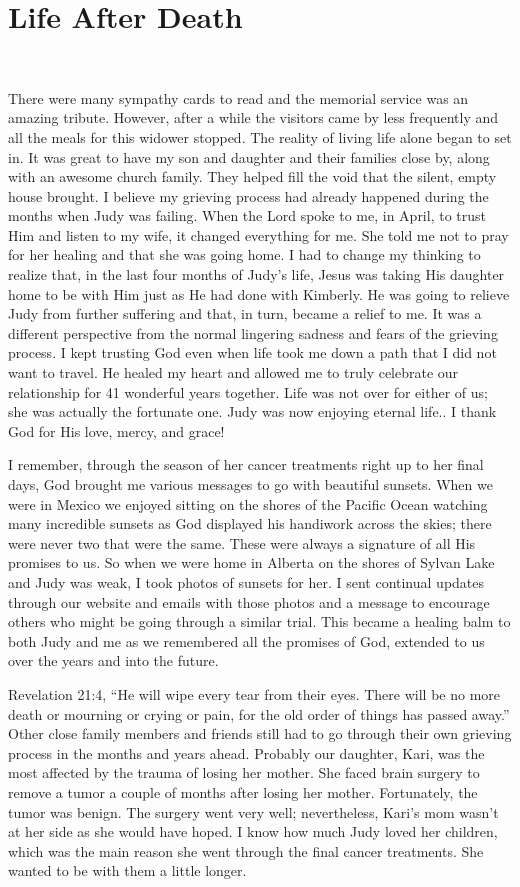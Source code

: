\documentclass[twoside, 12pt]{book}
\begin{document}
\chapter{Life After Death}
\

There were many sympathy cards to read and the memorial service was an amazing tribute. However, after a while the visitors came by less frequently and all the meals for this widower stopped. The reality of living life alone began to set in. It was great to have my son and daughter and their families close by, along with an awesome church family. They helped fill the void that the silent, empty house brought. I believe my grieving process had already happened during the months when Judy was failing. When the Lord spoke to me, in April, to trust Him and listen to my wife, it changed everything for me. She told me not to pray for her healing and that she was going home. I had to change my thinking to realize that, in the last four months of Judy’s life, Jesus was taking His daughter home to be with Him just as He had done with Kimberly. He was going to relieve Judy from further suffering and that, in turn, became a relief to me. It was a different perspective from the normal lingering sadness and fears of the grieving process. I kept trusting God even when life took me down a path that I did not want to travel. He healed my heart and allowed me to truly celebrate our relationship for 41 wonderful years together. Life was not over for either of us; she was actually the fortunate one. Judy was now enjoying eternal life.. I thank God for His love, mercy, and grace!

I remember, through the season of her cancer treatments right up to her final days, God brought me various messages to go with beautiful sunsets. When we were in Mexico we enjoyed sitting on the shores of the Pacific Ocean watching many incredible sunsets as God displayed his handiwork across the skies; there were never two that were the same. These were always a signature of all His promises to us. So when we were home in Alberta on the shores of Sylvan Lake and Judy was weak, I took photos of sunsets for her. I sent continual updates through our website and emails with those photos and a message to encourage others who might be going through a similar trial. This became a healing balm to both Judy and me as we remembered all the promises of God, extended to us over the years and into the future.

Revelation 21:4, “He will wipe every tear from their eyes. There will be no more death or mourning or crying or pain, for the old order of things has passed away.”
Other close family members and friends still had to go through their own grieving process in the months and years ahead. Probably our daughter, Kari, was the most affected by the trauma of losing her mother. She faced brain surgery to remove a tumor a couple of months after losing her mother. Fortunately, the tumor was benign. The surgery went very well; nevertheless, Kari’s mom wasn’t at her side as she would have hoped. I know how much Judy loved her children, which was the main reason she went through the final cancer treatments. She wanted to be with them a little longer.
\end{document}
